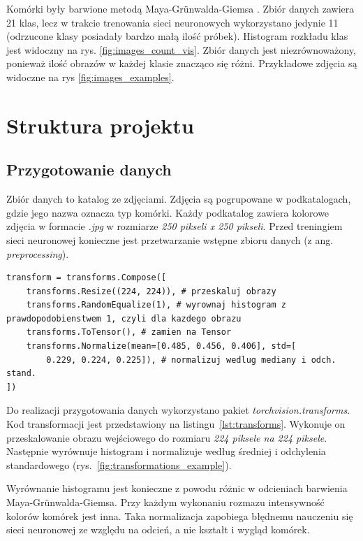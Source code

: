 Komórki były barwione metodą Maya-Grünwalda-Giemsa \cite{histology}.
Zbiór danych zawiera 21 klas, lecz w trakcie trenowania sieci neuronowych wykorzystano jedynie 11 (odrzucone klasy posiadały bardzo małą ilość próbek).
Histogram rozkładu klas jest widoczny na rys. \ref{fig:images_count_vis}.
Zbiór danych jest niezrównoważony, ponieważ ilość obrazów w każdej klasie znacząco się różni.
Przykładowe zdjęcia są widoczne na rys \ref{fig:images_examples}.


\section{Struktura projektu}

\subsection{Przygotowanie danych}

Zbiór danych to katalog ze zdjęciami.
Zdjęcia są pogrupowane w podkatalogach, gdzie jego nazwa oznacza typ komórki.
Każdy podkatalog zawiera kolorowe zdjęcia w formacie \textit{.jpg} w rozmiarze \textit{250 pikseli x 250 pikseli}.
Przed treningiem sieci neuronowej konieczne jest przetwarzanie wstępne zbioru danych (z ang. \textit{preprocessing}).

\begin{lstlisting}[language=ipython,caption={Transformacja danych}, label={lst:transforms}]
transform = transforms.Compose([
    transforms.Resize((224, 224)), # przeskaluj obrazy
    transforms.RandomEqualize(1), # wyrownaj histogram z prawdopodobienstwem 1, czyli dla kazdego obrazu
    transforms.ToTensor(), # zamien na Tensor
    transforms.Normalize(mean=[0.485, 0.456, 0.406], std=[
        0.229, 0.224, 0.225]), # normalizuj wedlug mediany i odch. stand.
])
\end{lstlisting}

Do realizacji przygotowania danych wykorzystano pakiet \textit{torchvision.transforms}.
Kod transformacji jest przedstawiony na listingu~\ref{lst:transforms}.
Wykonuje on przeskalowanie obrazu wejściowego do rozmiaru \textit{224 piksele na 224 piksele}.
Następnie wyrównuje histogram i normalizuje według średniej i odchylenia standardowego (rys.~\ref{fig:transformations_example}).

Wyrównanie histogramu jest konieczne z powodu różnic w odcieniach barwienia Maya-Grünwalda-Giemsa.
Przy każdym wykonaniu rozmazu intensywność kolorów komórek jest inna.
Taka normalizacja zapobiega błędnemu nauczeniu się sieci neuronowej ze względu na odcień, a nie kształt i wygląd komórek.

